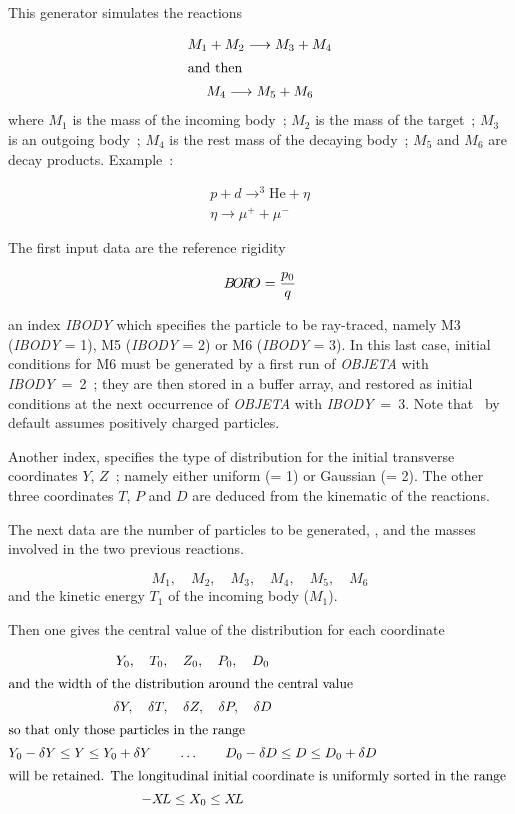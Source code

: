 This generator simulates the reactions 

\begin{gather*}
     M_1+M_2 \longrightarrow  M_3+M_4  \\
\intertext{and then} 
     M_4 \longrightarrow  M_5 + M_6 
\end{gather*}
%
where  $ M_1 $ is the mass of the incoming body~; $ M_2 $ is the mass
of the target~;  $ M_3 $ is an outgoing body~;  $ M_4 $ is the rest mass of the
decaying body~; $ M_5 $ and $ M_6 $ are decay products. Example~: 

  \begin{gather*}
	  p+d \longrightarrow^3 \text{He}  + \eta  \\
	 \eta  \longrightarrow  \mu^ ++ \mu^-
  \end{gather*}
   
\noindent The first input data are the reference rigidity 

$$ B\!O\!R\!O = \dfrac{p_0 }{ q} $$

\noindent an index \textsl{IBODY} which specifies the particle to be ray-traced, namely
M3 (\textsl{IBODY} = 1),  M5 (\textsl{IBODY} = 2) or M6 (\textsl{IBODY} = 3).  In this last case, 
initial conditions for M6 must be generated by a first run of \textsl{OBJETA} with 
\mbox{\textsl{IBODY} = 2}~;  they are then stored in a buffer array, and restored as initial conditions
at the next occurrence of \textsl{OBJETA} with \mbox{\textsl{IBODY} = 3}. Note that
\zgou\ by default assumes positively charged particles.  
\bigskip

\noindent Another index, \KOBJ specifies the type of
distribution for the initial transverse coordinates $ Y$, $Z $~;   
namely either uniform (\KOBJ = 1) or Gaussian 
(\KOBJ = 2).  The other three coordinates $ T$, $P$ and $ D $ are 
deduced from the kinematic of the reactions.   
\bigskip

\noindent The next data are the number of particles to be generated, 
\IMAX{}, and the masses involved  in the two previous
reactions. 
 
 $$ M_1,\quad M_2,\quad M_3,\quad M_4,\quad M_5,\quad M_6 $$
%
 and the kinetic energy $ T_1 $ of the incoming body ($M_1$). 
 
\noindent Then one gives the central value of the distribution for each
coordinate 

\begin{gather*}
	Y_0,\quad T_0,\quad Z_0,\quad P_0,\quad D_0    \\
\intertext{and the width of the distribution around the central value }
	 \delta Y,\quad \delta T,\quad \delta Z,\quad \delta P,\quad \delta D \\
\intertext{so that only those particles in the range }
	Y_0-\delta Y\leq Y\leq Y_0+\delta Y\qquad \ldots \qquad D_0-\delta
	D\leq D\leq D_0+\delta D  \\
\intertext{will be retained.  The longitudinal initial coordinate is uniformly
	sorted in the range }
	 -X\!L \leq  X_0 \leq  X\!L 
\end{gather*}
 
